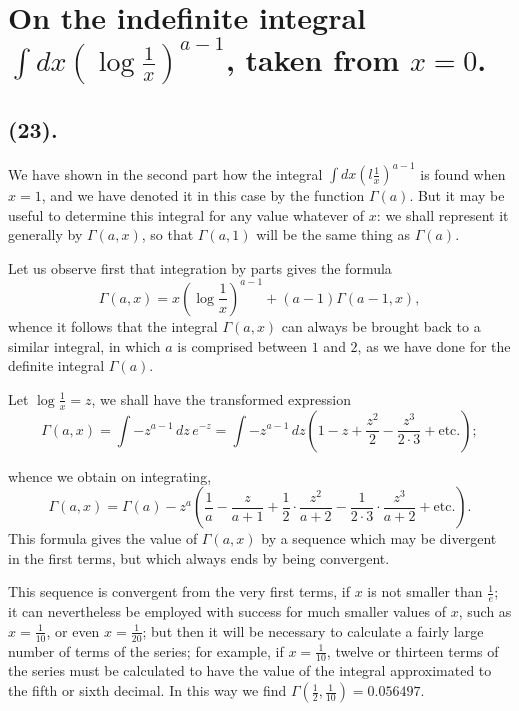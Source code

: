 \documentclass{article}
\begin{document}
\section*{On the indefinite integral $\displaystyle\int dx\left(\log\frac{1}{x}\right)^{a-1}$, taken from $x=0$.}

\subsection*{(23).}

We have shown in the second part how the integral $\displaystyle\int dx\left(l\frac{1}{x}\right)^{a-1}$ is found when $x=1$, and we have denoted it in this case by the function $\Gamma(a)$. But it may be useful to determine this integral for any value whatever of $x$: we shall represent it generally by $\Gamma(a,x)$, so that $\Gamma(a,1)$ will be the same thing as $\Gamma(a)$.

Let us observe first that integration by parts gives the formula
\[ \Gamma(a,x)=x\left(\log\frac{1}{x}\right)^{a-1}+(a-1)\Gamma(a-1,x), \tag{1} \]
whence it follows that the integral $\Gamma(a,x)$ can always be brought back to a similar integral, in which $a$ is comprised between $1$ and $2$, as we have done for the definite integral $\Gamma(a)$.

Let $\log\frac{1}{x}=z$, we shall have the transformed expression
\[ \Gamma(a,x)=\int -z^{a-1}\,dz\,e^{-z}=\int -z^{a-1}\,dz\left(1-z+\frac{z^{2}}{2}-\frac{z^{3}}{2\cdot3}+\text{etc.}\right); \]

whence we obtain on integrating,
\[ \Gamma(a,x)=\Gamma(a)-z^{a}\left(\frac{1}{a}-\frac{z}{a+1}+\frac{1}{2}\cdot\frac{z^{2}}{a+2}-\frac{1}{2\cdot3}\cdot\frac{z^{3}}{a+2}+\text{etc.}\right). \tag{2} \]
This formula gives the value of $\Gamma(a,x)$ by a sequence which may be divergent in the first terms, but which always ends by being convergent.

This sequence is convergent from the very first terms, if $x$ is not smaller than $\frac{1}{e}$; it can nevertheless be employed with success for much smaller values of $x$, such as $x=\frac{1}{10}$, or even $x=\frac{1}{20}$; but then it will be necessary to calculate a fairly large number of terms of the series; for example, if $x=\frac{1}{10}$, twelve or thirteen terms of the series must be calculated to have the value of the integral approximated to the fifth or sixth decimal. In this way we find $\Gamma\left(\frac{1}{2},\frac{1}{10}\right)=0.056497$.
\end{document}
